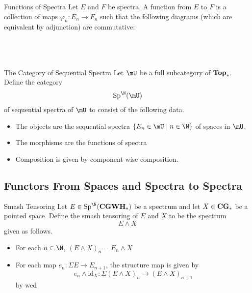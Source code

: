 \documentclass[a4paper]{article}
\begin{document}
\begin{defn}{Functions of Spectra}{} Let $E$ and $F$ be spectra. A function from $E$ to $F$ is a collection of maps $\varphi_n:E_n\to F_n$ such that the following diagrams (which are equivalent by adjunction) are commutative: \\~\\
\\~\\
\end{defn}

\begin{defn}{The Category of Sequential Spectra}{} Let $\mU$ be a full subcategory of $\bold{Top}_\ast$. Define the category $$\text{Sp}^\N(\mU)$$ of sequential spectra of $\mU$ to consist of the following data. 
\begin{itemize}
\item The objects are the sequential spectra $\{E_n\in\mU\;|\;n\in\N\}$ of spaces in $\mU$. 
\item The morphisms are the functions of spectra
\item Composition is given by component-wise composition. 
\end{itemize}
\end{defn}

\subsection{Functors From Spaces and Spectra to Spectra}
\begin{defn}{Smash Tensoring}{} Let $E\in\text{Sp}^\N(\bold{CGWH}_\ast)$ be a spectrum and let $X\in\bold{CG}_\ast$ be a pointed space. Define the smash tensoring of $E$ and $X$ to be the spectrum $$E\wedge X$$ given as follows. 
\begin{itemize}
\item For each $n\in\N$, $(E\wedge X)_n=E_n\wedge X$
\item For each map $e_n:\Sigma E\to E_{n+1}$, the structure map is given by $$e_n\wedge\text{id}_X:\Sigma(E\wedge X)_n\to(E\wedge X)_{n+1}$$ by wed
\end{itemize}
\end{defn}
\end{document}
